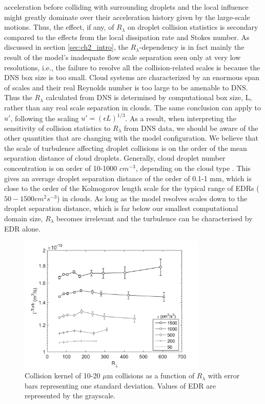 acceleration before colliding with surrounding droplets and the local influence might greatly dominate over their acceleration history given by the large-scale motions. Thus, the effect, if any, of $R_\lambda$ on droplet collision statistics is secondary compared to the effects from the local dissipation rate and Stokes number. As discussed in section \ref{sec:ch2_intro}, the $R_\lambda$-dependency is in fact mainly the result of the model's inadequate flow scale separation seen only at very low resolutions, i.e., the failure to resolve all the collision-related scales is because the DNS box size is too small. Cloud systems are characterized by an enormous span of scales and their real Reynolds number is too large to be amenable to DNS. Thus the $R_\lambda$ calculated from DNS is determined by computational box size, L, rather than any real scale separation in clouds. The same conclusion can  apply to $u\prime$, following the scaling $u\prime = (\epsilon L)^{1/3}$. As a result, when interpreting the sensitivity of collision statistics to $R_\lambda$ from DNS data, we should be aware of the other quantities that are changing with the model configuration. We believe that the scale of turbulence affecting droplet collisions is on the order of the mean separation distance of cloud droplets. Generally, cloud droplet number concentration is on order of 10-1000 $cm^{-3}$, depending on the cloud type \citep[e.g., ][]{Twomey1959, Bennartz2007, Leaitch1992}. This gives an average droplet separation distance of the order of 0.1-1 mm, which is close to the order of the Kolmogorov length scale for the typical range of EDRs ($50-1500 cm^2s^{-3}$) in clouds. As long as the model resolves scales down to the droplet separation distance, which is far below our smallest computational domain size, $R_\lambda$ becomes irrelevant and the turbulence can be characterised by EDR alone. 


\begin{figure}[ht]
\centering
\includegraphics[width=0.8\textwidth]{Figures/Chap2/Re_ck.jpg}
\caption{Collision kernel of 10-20 $\mu$m collisions as a function of $R_\lambda$ with error bars representing one standard deviation. Values of EDR are represented by the grayscale.} \label{fig:Re_ck}
\end{figure}

